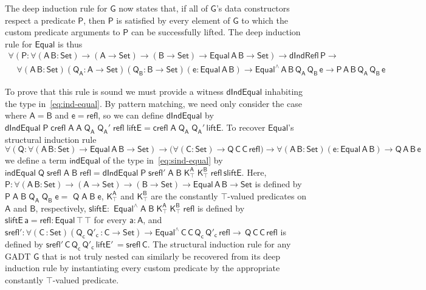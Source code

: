 \documentclass[9pt]{entcs}
\begin{document}
The deep induction rule for $\mathsf{G}$ now states that, if all of
$\mathsf{G}$'s data constructors respect a predicate $\mathsf{P}$,
then $\mathsf{P}$ is satisfied by every element of $\mathsf{G}$ to
which the custom predicate arguments to $\mathsf{P}$ can be
successfully lifted.  The deep induction rule for $\mathsf{Equal}$ is
thus
\begin{equation}\label{eq:ind-equal}
\begin{array}{l}
\mathsf{\forall (P : \forall (A\,B : Set) \to (A \to Set) \to (B \to
  Set) \to Equal\,A\,B \to Set) \to dIndRefl\,P \to}\\ \quad 
  \mathsf{\forall (A\,B : Set) (Q_A : A \to Set) (Q_B : B \to Set) (e:
  Equal\,A\,B) \to Equal^{\wedge}\,A\,B\,Q_A\,Q_B\,e \to
  P\,A\,B\,Q_A\,Q_B\,e}
\end{array}
\end{equation}

To prove that this rule is sound we must provide a witness
$\mathsf{dIndEqual}$ inhabiting the type in~\eqref{eq:ind-equal}.  By
pattern matching, we need only consider the case where $\mathsf{A} =
\mathsf{B}$ and $\mathsf{e} = \mathsf{refl}$, so we can define
$\mathsf{dIndEqual}$ by
$\mathsf{dIndEqual\;P\;crefl\;A\;A\;Q_A\;Q_A'\;refl\;liftE =
  crefl\;A\;Q_A\;Q_A'\,liftE}$. To recover $\mathsf{Equal}$'s structural
induction rule
\begin{equation}\label{eq:sind-equal}
\mathsf{\forall (Q : \forall (A\,B : Set)
  \to Equal\,A\,B \to Set) \to \big( \forall (C : Set) \to
  Q\,C\,C\,refl \big) \to \forall (A\,B : Set) (e: Equal\,A\,B) \to
  Q\,A\,B\,e}
\end{equation}
we define a term $\mathsf{indEqual}$ of the type
in~\eqref{eq:sind-equal} by $\mathsf{indEqual\;Q\;srefl\;A\;B\;refl =
  dIndEqual\;P\;srefl'\;A\;B\;
  K^A_\top\;K^B_\top\;refl\,sliftE}$. Here, $\mathsf{P : \forall (A\,B
  : Set) \to (A \to Set) \to (B \to Set) \to Equal\,A\,B \to Set}$ is
defined by $\mathsf{P\;A\;B\;Q_A\;Q_B\;e =}$ $\mathsf{Q\;A\;B\;e}$,
$\mathsf{K^A_\top}$ and $\mathsf{K^B_\top}$ are the constantly
$\mathsf{\top}$-valued predicates on $\mathsf{A}$ and $\mathsf{B}$,
respectively, $\mathsf{sliftE :}$ $\mathsf{Equal^{\wedge}\;A\;B\;
  K^A_\top\;K^B_\top\;refl}$ is defined by $\mathsf{sliftE\,a = refl :
  Equal\, \top\,\top}$ for every $\mathsf{a : A}$, and $\mathsf{srefl'
  : \forall (C\,: Set) (Q_c\,Q'_c\, : C \to Set) \to
  Equal^{\wedge}\,C\,C\,Q_c\,Q'_c\,refl \to \,Q\,C\,C\,refl}$ is
defined by $\mathsf{srefl'\,C\,Q_c\,Q'_c\,liftE'\,=srefl\, C}$.  The
structural induction rule for any GADT $\mathsf{G}$ that is not truly
nested can similarly be recovered from its deep induction rule by
instantiating every custom predicate by the appropriate constantly
$\mathsf{\top}$-valued predicate.
\end{document}
